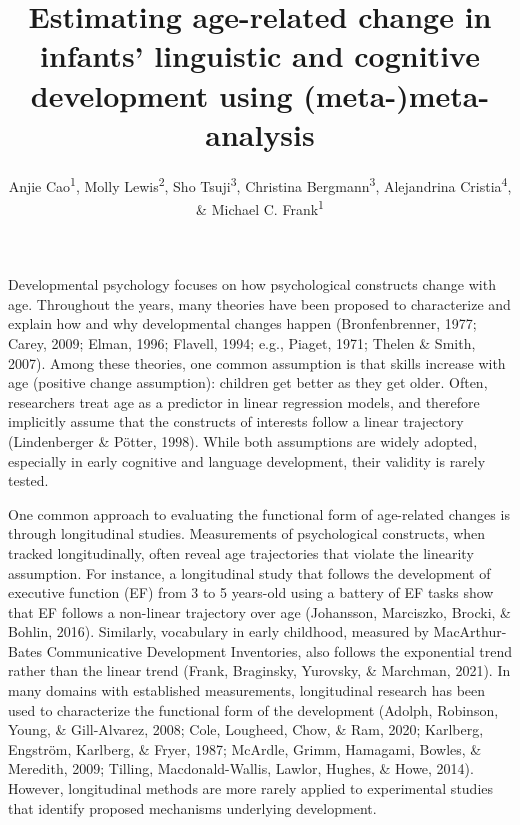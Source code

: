 \documentclass[
  man]{apa6}
\title{Estimating age-related change in infants' linguistic and cognitive development using (meta-)meta-analysis}
\author{Anjie Cao\textsuperscript{1}, Molly Lewis\textsuperscript{2}, Sho Tsuji\textsuperscript{3}, Christina Bergmann\textsuperscript{3}, Alejandrina Cristia\textsuperscript{4}, \& Michael C. Frank\textsuperscript{1}}
\date{}
\affiliation{\vspace{0.5cm}\textsuperscript{1} Stanford University\\\textsuperscript{2} ?\\\textsuperscript{3} ?\\\textsuperscript{4} ?}
\begin{document}
\maketitle

Developmental psychology focuses on how psychological constructs change with age. Throughout the years, many theories have been proposed to characterize and explain how and why developmental changes happen (Bronfenbrenner, 1977; Carey, 2009; Elman, 1996; Flavell, 1994; e.g., Piaget, 1971; Thelen \& Smith, 2007). Among these theories, one common assumption is that skills increase with age (positive change assumption): children get better as they get older. Often, researchers treat age as a predictor in linear regression models, and therefore implicitly assume that the constructs of interests follow a linear trajectory (Lindenberger \& Pötter, 1998). While both assumptions are widely adopted, especially in early cognitive and language development, their validity is rarely tested.

One common approach to evaluating the functional form of age-related changes is through longitudinal studies. Measurements of psychological constructs, when tracked longitudinally, often reveal age trajectories that violate the linearity assumption. For instance, a longitudinal study that follows the development of executive function (EF) from 3 to 5 years-old using a battery of EF tasks show that EF follows a non-linear trajectory over age (Johansson, Marciszko, Brocki, \& Bohlin, 2016). Similarly, vocabulary in early childhood, measured by MacArthur-Bates Communicative Development Inventories, also follows the exponential trend rather than the linear trend (Frank, Braginsky, Yurovsky, \& Marchman, 2021). In many domains with established measurements, longitudinal research has been used to characterize the functional form of the development (Adolph, Robinson, Young, \& Gill-Alvarez, 2008; Cole, Lougheed, Chow, \& Ram, 2020; Karlberg, Engström, Karlberg, \& Fryer, 1987; McArdle, Grimm, Hamagami, Bowles, \& Meredith, 2009; Tilling, Macdonald-Wallis, Lawlor, Hughes, \& Howe, 2014). However, longitudinal methods are more rarely applied to experimental studies that identify proposed mechanisms underlying development.
\end{document}
